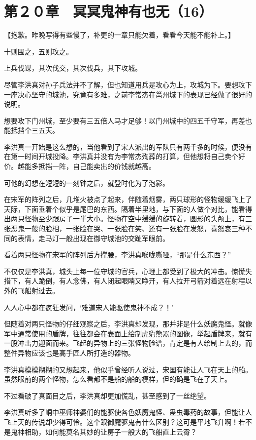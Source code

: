 \section{第２０章　冥冥鬼神有也无（16）}

【抱歉。昨晚写得有些慢了，补更的一章只能欠着，看看今天能不能补上。】

十则围之，五则攻之。

上兵伐谋，其次伐交，其次伐兵，其下攻城。

尽管李洪真对孙子兵法并不了解，但也知道用兵是攻心为上，攻城为下。要想攻下一座决心坚守的城池，究竟有多难，之前李常杰在邕州城下的表现已经做了很好的说明。

想要攻下门州城，至少要有三五倍人马才足够！以门州城中的四五千守军，再差也能抵挡个三五天。

李洪真一开始是这么想的，当他看到了宋人派出的军队只有两千多的时候，便没有在第一时间开城投降。李洪真并没有为李常杰殉葬的打算，但他想将自己卖个好价。越能多抵挡一阵，自己能卖出的价钱就越高。

可他的幻想在短短的一刻钟之后，就登时化为了泡影。

在宋军的阵列之后，几堆火被点了起来，伴随着烟雾，两只球形的怪物缓缓飞上了天际，下面垂着个似乎是尾巴的东西。隔着半里地，与下面的人做个对比，能看得出两只怪物至少跟房子一半大小。怪物在空中缓缓的旋转着，圆形的头颅上，有三张恶鬼一般的脸相，一张脸在哭、一张脸在笑、还有一张脸在发怒，喜怒哀三种不同的表情，走马灯一般出现在御守城池的交趾军眼前。

看着两只怪物在宋军的阵列后方撑腰，李洪真喉咙嘶哑，“那是什么东西？”

不仅仅是李洪真，城头上每一位守城的官兵，心理上都受到了极大的冲击。惊慌失措下，有人跪倒，有人念佛，有人闭起眼睛又睁开，有人拉开弓箭对着远在射程以外的飞船射过去。

人人心中都在疯狂发问，‘难道宋人能驱使鬼神不成？！’

但随着对两只怪物的仔细观察之后，李洪真却发现，那并非是什么妖魔鬼怪。就像军中通常使用的盾牌，往往都会在表面上绘制虎豹熊罴的图像，举起盾牌来，就有一股冲击力迎面而来。飞起的异物上的三张怪物脸谱，肯定是有人绘制上去的，而整件异物应该也是高手匠人所打造的器物。

李洪真模模糊糊的又想起来，他似乎曾经听人说过，宋国有能让人飞在天上的船。虽然眼前的两个怪物，怎么看都不是船的船的模样，但的确是飞在了天上。

不过看破了真面目之后，李洪真却更加慌乱，甚至感到了一丝绝望。

李洪真听多了峒中巫师神婆们的能驱使各色妖魔鬼怪、蛊虫毒药的故事，但能让人飞上天的传说却少得可怜。这个跟御魔驱鬼有什么区别？这可是平地飞升啊！若不是鬼神相助，如何能莫名其妙的让房子一般大的飞船直上云霄？

